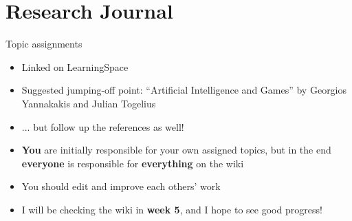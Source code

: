 \part{Research Journal}
\frame{\partpage}

\begin{frame}{Topic assignments}
	\begin{itemize}
		\pause\item Linked on LearningSpace
		\pause\item Suggested jumping-off point: ``Artificial Intelligence and Games'' by Georgios Yannakakis and Julian Togelius
		\pause\item ... but follow up the references as well!
		\pause\item \textbf{You} are initially responsible for your own assigned topics,
			but in the end \textbf{everyone} is responsible for \textbf{everything} on the wiki
		\pause\item You should edit and improve each others' work
		\pause\item I will be checking the wiki in \textbf{week 5}, and I hope to see good progress!
	\end{itemize}
\end{frame}

